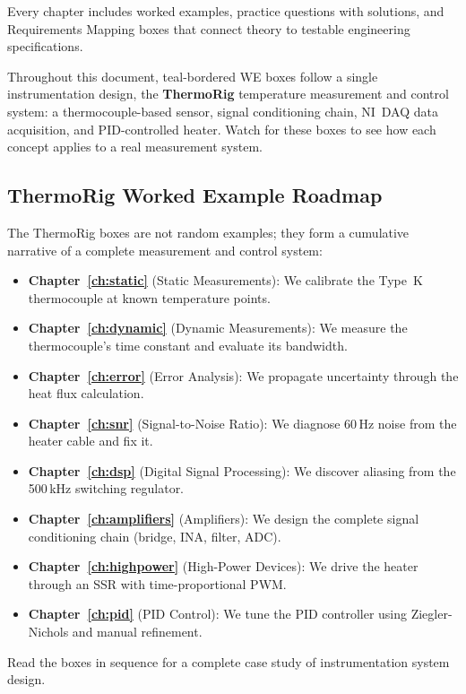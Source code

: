\documentclass[11pt,letterpaper,twoside,openany]{book}
\begin{document}
Every chapter includes worked examples, practice questions with solutions, and Requirements Mapping boxes that connect theory to testable engineering specifications.

\begin{tipbox}
Throughout this document, teal-bordered \textsf{WE} boxes follow a single instrumentation design, the \textbf{ThermoRig} temperature measurement and control system: a thermocouple-based sensor, signal conditioning chain, NI~DAQ data acquisition, and PID-controlled heater. Watch for these boxes to see how each concept applies to a real measurement system.
\end{tipbox}


\subsection*{ThermoRig Worked Example Roadmap}
The ThermoRig boxes are not random examples; they form a cumulative narrative of a complete measurement and control system:
\begin{itemize}[nosep,leftmargin=1.5em]
\item \textbf{Chapter~\ref{ch:static}} (Static Measurements): We calibrate the Type~K thermocouple at known temperature points.
\item \textbf{Chapter~\ref{ch:dynamic}} (Dynamic Measurements): We measure the thermocouple's time constant and evaluate its bandwidth.
\item \textbf{Chapter~\ref{ch:error}} (Error Analysis): We propagate uncertainty through the heat flux calculation.
\item \textbf{Chapter~\ref{ch:snr}} (Signal-to-Noise Ratio): We diagnose 60\,Hz noise from the heater cable and fix it.
\item \textbf{Chapter~\ref{ch:dsp}} (Digital Signal Processing): We discover aliasing from the 500\,kHz switching regulator.
\item \textbf{Chapter~\ref{ch:amplifiers}} (Amplifiers): We design the complete signal conditioning chain (bridge, INA, filter, ADC).
\item \textbf{Chapter~\ref{ch:highpower}} (High-Power Devices): We drive the heater through an SSR with time-proportional PWM.
\item \textbf{Chapter~\ref{ch:pid}} (PID Control): We tune the PID controller using Ziegler-Nichols and manual refinement.
\end{itemize}
Read the boxes in sequence for a complete case study of instrumentation system design.
\end{document}
